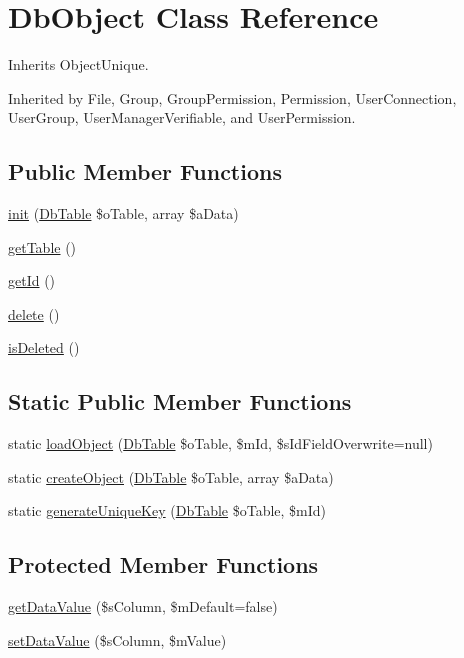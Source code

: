\hypertarget{class_db_object}{\section{Db\-Object Class Reference}
\label{class_db_object}
}


Inherits Object\-Unique.



Inherited by File, Group, Group\-Permission, Permission, User\-Connection, User\-Group, User\-Manager\-Verifiable, and User\-Permission.

\subsection*{Public Member Functions}
\begin{DoxyCompactItemize}
\item 
\hyperlink{class_db_object_ab3d335221706ac2e08f299a4455f6a31}{init} (\hyperlink{class_db_table}{Db\-Table} \$o\-Table, array \$a\-Data)
\item 
\hyperlink{class_db_object_ab927f1a5cac1905a0be1452d0ef76aac}{get\-Table} ()
\item 
\hyperlink{class_db_object_a38e5ae3d5bf25b14cbaf70abe7e8159c}{get\-Id} ()
\item 
\hyperlink{class_db_object_afba4ed3fd0560178f3dde75ca5f71b8d}{delete} ()
\item 
\hyperlink{class_db_object_a3e1d2098bd1491048f134dc8fcde055c}{is\-Deleted} ()
\end{DoxyCompactItemize}
\subsection*{Static Public Member Functions}
\begin{DoxyCompactItemize}
\item 
static \hyperlink{class_db_object_a34b933c020ec318e268ba64ed65f5b9f}{load\-Object} (\hyperlink{class_db_table}{Db\-Table} \$o\-Table, \$m\-Id, \$s\-Id\-Field\-Overwrite=null)
\item 
static \hyperlink{class_db_object_a48c2d33c43e6f0b68b4e7dcde9cd8c12}{create\-Object} (\hyperlink{class_db_table}{Db\-Table} \$o\-Table, array \$a\-Data)
\item 
static \hyperlink{class_db_object_a8b9c9c2300e93e1e84b08c90a20d651d}{generate\-Unique\-Key} (\hyperlink{class_db_table}{Db\-Table} \$o\-Table, \$m\-Id)
\end{DoxyCompactItemize}
\subsection*{Protected Member Functions}
\begin{DoxyCompactItemize}
\item 
\hyperlink{class_db_object_a449264f07a4601bdd23572b8162557c1}{get\-Data\-Value} (\$s\-Column, \$m\-Default=false)
\item 
\hyperlink{class_db_object_a1cf703960ff6db11c765991c7a510bee}{set\-Data\-Value} (\$s\-Column, \$m\-Value)
\end{DoxyCompactItemize}


